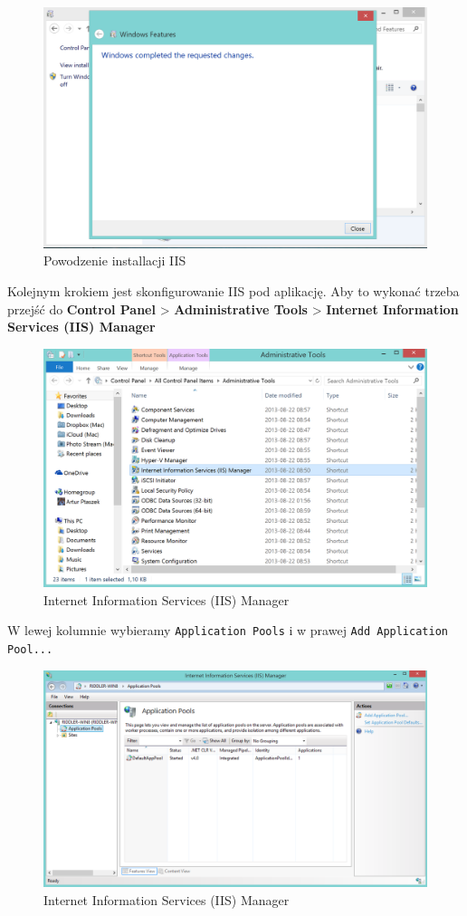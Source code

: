\documentclass[10pt,titlepage]{article}
\begin{document}
\begin{figure}[H]
  \centering
  \includegraphics[scale=0.35]{images/install3.png}
  \caption{Powodzenie installacji IIS}
\end{figure}
\par Kolejnym krokiem jest skonfigurowanie IIS pod aplikację. Aby to wykonać trzeba przejść do \textbf{Control Panel} > \textbf{Administrative Tools} > \textbf{Internet Information Services (IIS) Manager}
\begin{figure}[H]
  \centering
  \includegraphics[scale=0.35]{images/install4.png}
  \caption{Internet Information Services (IIS) Manager}
\end{figure}
\par W lewej kolumnie wybieramy \verb|Application Pools| i w prawej \verb|Add Application Pool...|
\begin{figure}[H]
  \centering
  \includegraphics[scale=0.35]{images/install5.png}
  \caption{Internet Information Services (IIS) Manager}
\end{figure}
\end{document}
